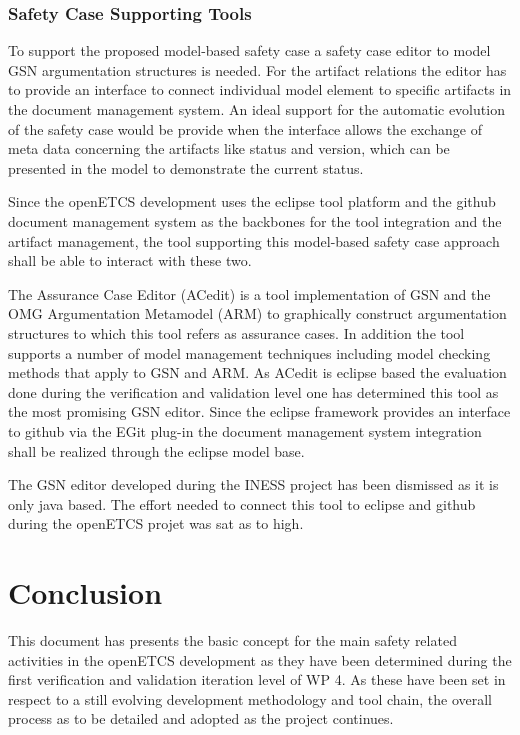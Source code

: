 \documentclass{template/openetcs_report}
\begin{document}
\subsection{Safety Case Supporting Tools}

To support the proposed model-based safety case a safety case editor to model GSN argumentation structures is needed. For the artifact relations the editor has to provide an interface to connect individual model element to specific artifacts in the document management system. An ideal support for the automatic evolution of the safety case would be provide when the interface allows the exchange of meta data concerning the artifacts like status and version, which can be presented in the model to demonstrate the current status.

Since the openETCS development uses the eclipse tool platform and the github document management system as the backbones for the tool integration and the artifact management, the tool supporting this model-based safety case approach shall be able to interact with these two. 

The Assurance Case Editor (ACedit) \cite{aceditwebsite} is a tool implementation of GSN \cite{GSNwebsite} and the OMG Argumentation  Metamodel  (ARM) \cite{ARMwebsite} to graphically construct argumentation structures to which this tool refers as assurance cases. In addition the tool supports a number of model management techniques including model checking methods that apply to GSN and ARM. As ACedit is eclipse based the evaluation done during the verification and validation level one has determined this tool as the most promising GSN editor. Since the eclipse framework provides an interface to github via the EGit plug-in the document management system integration shall be realized through the eclipse model base.

The GSN editor developed during the INESS project has been dismissed as it is only java based. The effort needed to connect this tool to eclipse and github during the openETCS projet was sat as to high. 
 
\chapter{Conclusion}
\label{sec:conclusion}

This document has presents the basic concept for the main safety related activities in the openETCS development as they have been determined during the first verification and validation iteration level of WP 4. As these have been set in respect to a still evolving development methodology and tool chain, the overall process as to be detailed and adopted as the project continues. 
\end{document}
